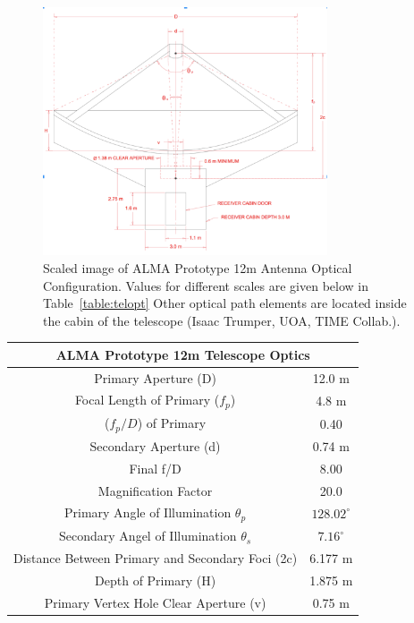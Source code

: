 \documentclass[manuscript]{aastex}
\begin{document}
\begin{figure}[H]
\centering
\captionsetup{width=0.75\textwidth}
\includegraphics[width=0.75\textwidth]{telopt.png}
\caption[ALMA Prototype 12m Optical Configuration -(Isaac Trumper, UOA, TIME COllab.)]{Scaled image of ALMA Prototype 12m Antenna Optical Configuration. Values for different scales are given below in Table~\ref{table:telopt} Other optical path elements are located inside the cabin of the telescope (Isaac Trumper, UOA, TIME Collab.).}
\label{fig:tele}
\end{figure}

\begin{center}
\begin{tabular}{|c|c|}
\hline
\multicolumn{2}{|c|}{ALMA Prototype 12m Telescope Optics}\\
\hline
\hline
Primary Aperture (D) & 12.0 m \\
Focal Length of Primary (\(f_{p}\)) & 4.8 m \\
(\(f_{p}/D\)) of Primary & 0.40 \\
Secondary Aperture (d) & 0.74 m \\
Final f/D & 8.00 \\
Magnification Factor & 20.0 \\
Primary Angle of Illumination \(\theta_{p}\) & \(128.02^{\circ}\) \\
Secondary Angel of Illumination \(\theta_{s}\) & \(7.16^{\circ}\) \\
Distance Between Primary and Secondary Foci (2c) & 6.177 m \\
Depth of Primary (H) & 1.875 m \\
Primary Vertex Hole Clear Aperture (v) & 0.75 m \\

\hline
\end{tabular}\label{table:telopt}
\end{center}
\end{document}
